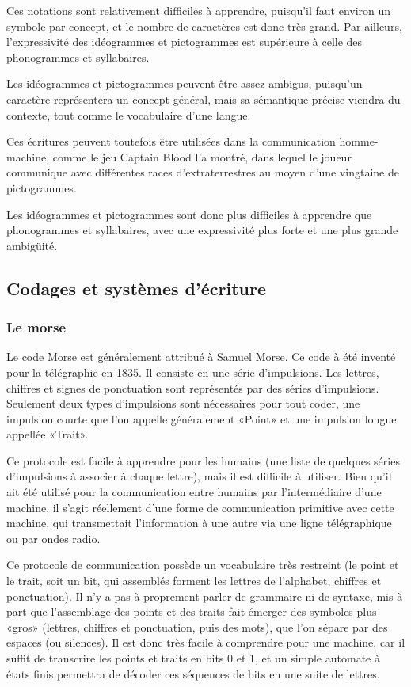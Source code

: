 \documentclass[french,a4paper]{article}
\begin{document}
Ces notations sont relativement difficiles à apprendre, puisqu'il faut
environ un symbole par concept, et le nombre de caractères est donc
très grand. Par ailleurs, l'expressivité des idéogrammes et
pictogrammes est supérieure à celle des phonogrammes et syllabaires.

Les idéogrammes et pictogrammes peuvent être assez ambigus, puisqu'un
caractère représentera un concept général, mais sa sémantique précise
viendra du contexte, tout comme le vocabulaire d'une langue.

Ces écritures peuvent toutefois être utilisées dans la communication
homme-machine, comme le jeu Captain Blood l'a montré, dans lequel le
joueur communique avec différentes races d'extraterrestres au moyen
d'une vingtaine de pictogrammes.

Les idéogrammes et pictogrammes sont donc plus difficiles à apprendre
que phonogrammes et syllabaires, avec une expressivité plus forte et
une plus grande ambigüité.

\subsection{Codages et systèmes d'écriture}
\subsubsection{Le morse}
Le code Morse est généralement attribué à Samuel Morse. Ce code à été
inventé pour la télégraphie en 1835.  Il consiste en une série
d'impulsions. Les lettres, chiffres et signes de ponctuation sont
représentés par des séries d'impulsions.  Seulement deux types
d'impulsions sont nécessaires pour tout coder, une impulsion courte
que l'on appelle généralement «Point» et une impulsion longue appellée
«Trait».

Ce protocole est facile à apprendre pour les humains (une liste de
quelques séries d'impulsions à associer à chaque lettre), mais il est
difficile à utiliser. Bien qu'il ait été utilisé pour la communication
entre humains par l'intermédiaire d'une machine, il s'agit réellement
d'une forme de communication primitive avec cette machine, qui
transmettait l'information à une autre via une ligne télégraphique ou
par ondes radio.

Ce protocole de communication possède un vocabulaire très restreint
(le point et le trait, soit un bit, qui assemblés forment les lettres
de l'alphabet, chiffres et ponctuation). Il n'y a pas à proprement
parler de grammaire ni de syntaxe, mis à part que l'assemblage des
points et des traits fait émerger des symboles plus «gros» (lettres,
chiffres et ponctuation, puis des mots), que l'on sépare par des
espaces (ou silences). Il est donc très facile à comprendre pour une
machine, car il suffit de transcrire les points et traits en bits 0 et
1, et un simple automate à états finis permettra de décoder ces
séquences de bits en une suite de lettres.
\end{document}
